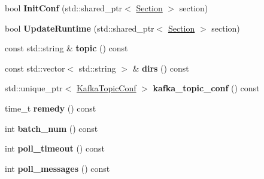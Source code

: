 \begin{DoxyCompactItemize}
\item 
bool {\bfseries Init\+Conf} (std\+::shared\+\_\+ptr$<$ \hyperlink{classlog2hdfs_1_1Section}{Section} $>$ section)\hypertarget{classlog2hdfs_1_1TopicConf_ae35b11051f7feb5203cf1f8d7efdbf89}{}\label{classlog2hdfs_1_1TopicConf_ae35b11051f7feb5203cf1f8d7efdbf89}

\item 
bool {\bfseries Update\+Runtime} (std\+::shared\+\_\+ptr$<$ \hyperlink{classlog2hdfs_1_1Section}{Section} $>$ section)\hypertarget{classlog2hdfs_1_1TopicConf_a7858567a96f4790bbb196576ca535e5e}{}\label{classlog2hdfs_1_1TopicConf_a7858567a96f4790bbb196576ca535e5e}

\item 
const std\+::string \& {\bfseries topic} () const \hypertarget{classlog2hdfs_1_1TopicConf_afd5c6e57b07373e2cf3f88e15b02323e}{}\label{classlog2hdfs_1_1TopicConf_afd5c6e57b07373e2cf3f88e15b02323e}

\item 
const std\+::vector$<$ std\+::string $>$ \& {\bfseries dirs} () const \hypertarget{classlog2hdfs_1_1TopicConf_ab7f1090d6a2fe326d016006fe5fe1dc1}{}\label{classlog2hdfs_1_1TopicConf_ab7f1090d6a2fe326d016006fe5fe1dc1}

\item 
std\+::unique\+\_\+ptr$<$ \hyperlink{classlog2hdfs_1_1KafkaTopicConf}{Kafka\+Topic\+Conf} $>$ {\bfseries kafka\+\_\+topic\+\_\+conf} () const \hypertarget{classlog2hdfs_1_1TopicConf_a91ba16c8d08aecd112729764bc1ad27f}{}\label{classlog2hdfs_1_1TopicConf_a91ba16c8d08aecd112729764bc1ad27f}

\item 
time\+\_\+t {\bfseries remedy} () const \hypertarget{classlog2hdfs_1_1TopicConf_a3f53ed29fd7bac2698de6c9b2fb6f0be}{}\label{classlog2hdfs_1_1TopicConf_a3f53ed29fd7bac2698de6c9b2fb6f0be}

\item 
int {\bfseries batch\+\_\+num} () const \hypertarget{classlog2hdfs_1_1TopicConf_acda3fad68a306cdfb0c2ccbfcd7d2eee}{}\label{classlog2hdfs_1_1TopicConf_acda3fad68a306cdfb0c2ccbfcd7d2eee}

\item 
int {\bfseries poll\+\_\+timeout} () const \hypertarget{classlog2hdfs_1_1TopicConf_a6240855dcfbe05164aec4d0167130e17}{}\label{classlog2hdfs_1_1TopicConf_a6240855dcfbe05164aec4d0167130e17}

\item 
int {\bfseries poll\+\_\+messages} () const \hypertarget{classlog2hdfs_1_1TopicConf_ad0cf4d98b1f9d3c7ec4d652f24697d86}{}\label{classlog2hdfs_1_1TopicConf_ad0cf4d98b1f9d3c7ec4d652f24697d86}

\end{DoxyCompactItemize}
